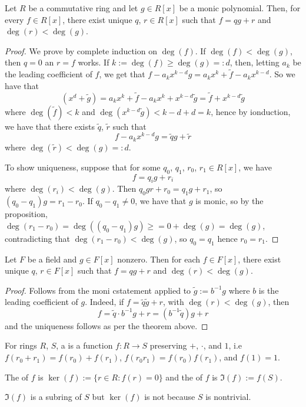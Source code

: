 \begin{thmbox}
    Let $R$ be a commutative ring and let $g \in R[x]$ be a monic polynomial. Then, for every $f \in R[x]$, there exist unique $q$, $r \in R[x]$ such that $f = qg + r$ and $\deg(r) < \deg(g)$. 
\end{thmbox}

\begin{proof}
    We prove by complete induction on $\deg(f)$. If $\deg(f) < \deg(g)$, then $q = 0$ an $r = f$ works. If $k := \deg(f) \geq \deg(g) =: d$, then, letting $a_k$ be the leading coefficient of $f$, we get that $f - a_kx^{k-d}g = a_kx^k + \tilde{f} - a_kx^{k-d}$. So we have that 
    \[ (x^d + \tilde{g}) = a_kx^k + \tilde{f} - a_kx^k + x^{k-d}\tilde{g} = \tilde{f} + x^{k-d}\tilde{g} \]
    where $\deg(\tilde{f}) < k$ and $\deg(x^{k-d}\tilde{g}) < k - d + d = k$, hence by ionduction, we have that there exists $\tilde{q}$, $\tilde{r}$ such that 
    \[ f - a_kx^{k-d}g = \tilde{q}g + \tilde{r} \] 
    where $\deg(\tilde{r}) < \deg(g) =: d$. 

    To show uniqueness, suppose that for some $q_0$, $q_1$, $r_0$, $r_1 \in R[x]$, we have 
    \[ f = q_ig + r_i\]
    where $\deg(r_i) < \deg(g)$. Then $q_0gr+r_0 = q_1g + r_1$, so $(q_0 - q_1)g = r_1 - r_0$. If $q_0 - q_1 \neq 0$, we have that $g$ is monic, so by the proposition, $\deg(r_1 - r_0) = \deg((q_0 - q_1)g) \geq = 0 + \deg(g) = \deg(g)$, contradicting that $\deg(r_1 - r_0) < \deg(g)$, so $q_0 = q_1$ hence $r_0 = r_1$. 
\end{proof}

\begin{corrbox}
    Let $F$ be a field and $g \in F[x]$ nonzero. Then for each $f \in F[x]$, there exist unique $q$, $r \in F[x]$ such that $f = qg + r$ and $\deg(r) < \deg(g)$. 
\end{corrbox}

\begin{proof}
    Follows from the moni cstatement applied to $\tilde{g} := b^{-1}g$ where $b$ is the leading coefficient of $g$. Indeed, if $f = \tilde{q}\tilde{g} + r$, with $\deg(r) < \deg(g)$, then 
    \[ f = \tilde{q} \cdot b^{-1}g + r = (b^{-1}\tilde{q})g + r \]
    and the uniqueness follows as per the theorem above.
\end{proof}

\begin{defbox}
    For rings $R$, $S$, a  is a function $f \colon R \to S$ preserving $+$, $\cdot$, and $1$, i.e $f(r_0 + r_1) = f(r_0) + f(r_1)$, $f(r_0r_1) = f(r_0)f(r_1)$, and $f(1) = 1$. 

    The  of $f$ is $\ker(f) := \{r \in R : f(r) = 0\}$ and the  of $f$ is $\Im(f) := f(S)$. 
\end{defbox}
$\Im(f)$ is a subring of $S$ but $\ker(f)$ is not because $S$ is nontrivial. 